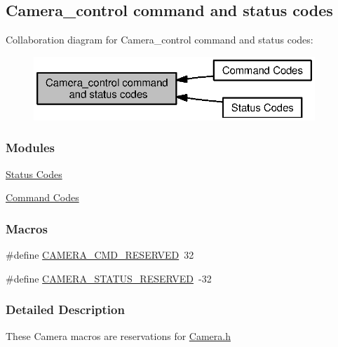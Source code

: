 \subsection{Camera\+\_\+control command and status codes}
\label{group___c_a_m_e_r_a___c_o_n_t_r_o_l}
Collaboration diagram for Camera\+\_\+control command and status codes\+:
\nopagebreak
\begin{figure}[H]
\begin{center}
\leavevmode
\includegraphics[width=301pt]{group___c_a_m_e_r_a___c_o_n_t_r_o_l}
\end{center}
\end{figure}
\subsubsection*{Modules}
\begin{DoxyCompactItemize}
\item 
\hyperlink{group___camera___s_t_a_t_u_s}{Status Codes}
\item 
\hyperlink{group___camera___c_m_d}{Command Codes}
\end{DoxyCompactItemize}
\subsubsection*{Macros}
\begin{DoxyCompactItemize}
\item 
\#define \hyperlink{group___c_a_m_e_r_a___c_o_n_t_r_o_l_gaed2b3df48a75ec7e6e78320bb3a48eb9}{C\+A\+M\+E\+R\+A\+\_\+\+C\+M\+D\+\_\+\+R\+E\+S\+E\+R\+V\+E\+D}~32
\item 
\#define \hyperlink{group___c_a_m_e_r_a___c_o_n_t_r_o_l_ga13b3728d2673d72db6cc71744a0cbedf}{C\+A\+M\+E\+R\+A\+\_\+\+S\+T\+A\+T\+U\+S\+\_\+\+R\+E\+S\+E\+R\+V\+E\+D}~-\/32
\end{DoxyCompactItemize}


\subsubsection{Detailed Description}
These Camera macros are reservations for \hyperlink{_camera_8h}{Camera.\+h} 

